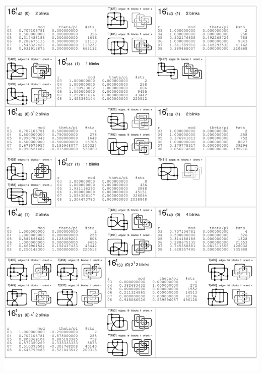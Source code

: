 \begin{center}
 \includegraphics[height=23.5cm]{E.figsbw2/con3catalog029_bw.pdf} \eject

\end{center}

